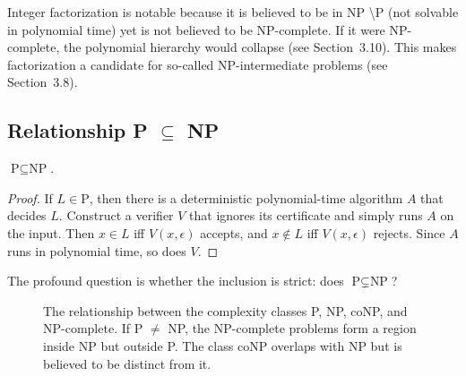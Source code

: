 Integer factorization is notable because it is believed to be in NP \textbackslash P (not solvable in polynomial time) yet is not believed to be NP-complete. If it were NP-complete, the polynomial hierarchy would collapse (see Section~3.10). This makes factorization a candidate for so-called NP-intermediate problems (see Section~3.8).

\subsection{Relationship P $\subseteq$ NP}

\begin{proposition}
$\text{P} \subseteq \text{NP}$.
\end{proposition}

\begin{proof}
If $L \in \text{P}$, then there is a deterministic polynomial-time algorithm $A$ that decides $L$. Construct a verifier $V$ that ignores its certificate and simply runs $A$ on the input. Then $x \in L$ iff $V(x, \epsilon)$ accepts, and $x \notin L$ iff $V(x, \epsilon)$ rejects. Since $A$ runs in polynomial time, so does $V$.
\end{proof}

The profound question is whether the inclusion is strict: does $\text{P} \subsetneq \text{NP}$?

\begin{figure}[htbp]
\centering
{}
\caption{The relationship between the complexity classes P, NP, coNP, and NP-complete. If P $\neq$ NP, the NP-complete problems form a region inside NP but outside P. The class coNP overlaps with NP but is believed to be distinct from it.}
\label{fig:venn-complexity}
\end{figure}

